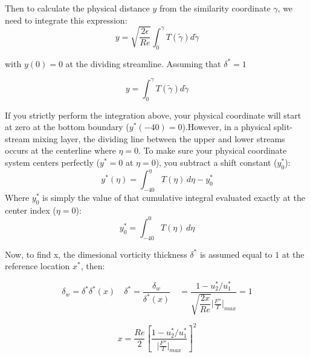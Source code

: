 Then to calculate the physical distance $y$ from the similarity coordinate $\gamma$, we need to integrate this expression:
\begin{equation*}
   y
   =
   \sqrt{\frac{2\epsilon}{Re}}
   \int_0^\gamma
   T(\tilde{\gamma})
   d\tilde{\gamma}
\end{equation*}

with $y(0)=0$ at the dividing streamline. 
Assuming that $\delta^*=1$

\begin{equation*}
   y
   =
   \int_0^\gamma
   T(\tilde{\gamma})
   d\tilde{\gamma}
\end{equation*}

If you strictly perform the integration above, your physical coordinate will
start at zero at the bottom boundary ($y^*(-40) = 0$).However, in a physical
split-stream mixing layer, the dividing line between the upper and lower streams
occurs at the centerline where $\eta = 0$. To make sure your physical coordinate
system centers perfectly ($y^* = 0$ at $\eta = 0$), you subtract a shift
constant ($y^*_0$):$$y^*(\eta) = \int_{-40}^{\eta} T(\eta) \, d\eta -
y^*_0$$Where $y^*_0$ is simply the value of that cumulative integral evaluated
exactly at the center index ($\eta = 0$):$$y^*_0 = \int_{-40}^{0} T(\eta) \,
d\eta$$

Now, to find x, the dimesional vorticity thickness $\delta^*$ is assumed equal to $1$ at the reference location $x^*$, then:

\begin{equation*}
\delta_w
=
\delta^*
\delta^*(x)
\quad
\delta^*
=
\frac{\delta_w}
{\delta^*(x)}
\quad
=
 \dfrac{1-u_2^*/u_1^*}
 {
\sqrt{\dfrac{2x}{Re}}
   \big|
   \frac{F''}{T}
   \big|_{max}
  }
  =1
\end{equation*}

\begin{equation*}
   x
   =
   \frac{Re}{2}
   \left[
   \frac{1-u_2^*/u_1^*}
   {\big|
   \frac{F''}{T}  \big|_{max}
   }
   \right]^2
\end{equation*}



